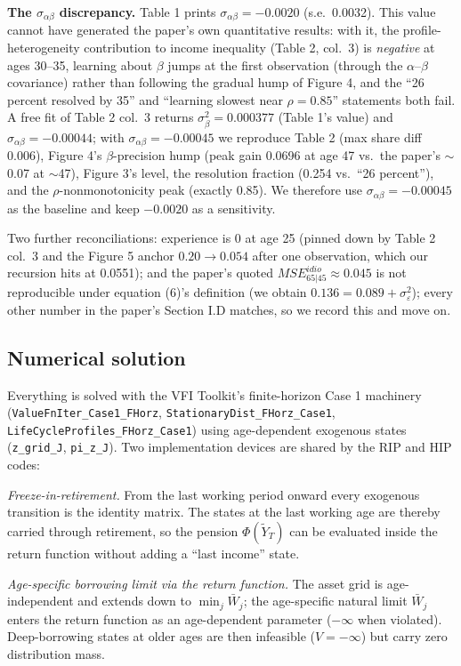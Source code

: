 \documentclass[11pt,fleqn]{article}
\begin{document}
\textbf{The $\sigma_{\alpha\beta}$ discrepancy.} Table 1 prints
$\sigma_{\alpha\beta}=-0.0020$ (s.e.\ 0.0032). This value cannot have generated the
paper's own quantitative results: with it, the profile-heterogeneity contribution to
income inequality (Table 2, col.~3) is \emph{negative} at ages 30--35, learning about
$\beta$ jumps at the first observation (through the $\alpha$--$\beta$ covariance)
rather than following the gradual hump of Figure 4, and the ``26 percent resolved by
35'' and ``learning slowest near $\rho=0.85$'' statements both fail. A free fit of
Table 2 col.~3 returns $\sigma^2_\beta=0.000377$ (Table 1's value) and
$\sigma_{\alpha\beta}=-0.00044$; with $\sigma_{\alpha\beta}=-0.00045$ we reproduce
Table 2 (max share diff 0.006), Figure 4's $\beta$-precision hump (peak gain 0.0696
at age 47 vs.\ the paper's $\sim$0.07 at $\sim$47), Figure 3's level, the resolution
fraction (0.254 vs.\ ``26 percent''), and the $\rho$-nonmonotonicity peak (exactly
0.85). We therefore use $\sigma_{\alpha\beta}=-0.00045$ as the baseline and keep
$-0.0020$ as a sensitivity.

Two further reconciliations: experience is 0 at age 25 (pinned down by Table 2
col.~3 and the Figure 5 anchor $0.20\to0.054$ after one observation, which our
recursion hits at 0.0551); and the paper's quoted $MSE^{idio}_{65|45}\approx0.045$
is not reproducible under equation (6)'s definition (we obtain
$0.136=0.089+\sigma^2_\varepsilon$); every other number in the paper's Section I.D
matches, so we record this and move on.

\subsection{Numerical solution}

Everything is solved with the VFI Toolkit's finite-horizon Case 1 machinery
(\texttt{ValueFnIter\_Case1\_FHorz}, \texttt{StationaryDist\_FHorz\_Case1},
\texttt{LifeCycleProfiles\_FHorz\_Case1}) using age-dependent exogenous states
(\texttt{z\_grid\_J}, \texttt{pi\_z\_J}). Two implementation devices are shared by
the RIP and HIP codes:

\emph{Freeze-in-retirement.} From the last working period onward every exogenous
transition is the identity matrix. The states at the last working age are thereby
carried through retirement, so the pension $\Phi(\tilde{Y}_T)$ can be evaluated
inside the return function without adding a ``last income'' state.

\emph{Age-specific borrowing limit via the return function.} The asset grid is
age-independent and extends down to $\min_j \bar{W}_j$; the age-specific natural
limit $\bar{W}_j$ enters the return function as an age-dependent parameter
($-\infty$ when violated). Deep-borrowing states at older ages are then infeasible
($V=-\infty$) but carry zero distribution mass.
\end{document}
